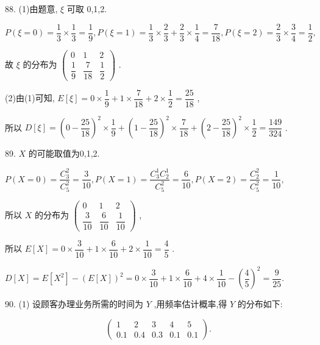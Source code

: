 88. (1)由题意, $\xi$ 可取 0,1,2.

$P\left( {\xi  = 0}\right)  = \dfrac{1}{3} \times  \dfrac{1}{3} = \dfrac{1}{9},P\left( {\xi  = 1}\right)  = \dfrac{1}{3} \times  \dfrac{2}{3} + \dfrac{2}{3} \times  \dfrac{1}{4} = \dfrac{7}{18},P\left( {\xi  = 2}\right)  = \dfrac{2}{3} \times  \dfrac{3}{4} = \dfrac{1}{2},$

故 $\xi$ 的分布为 $\left( \begin{matrix} 0 & 1 & 2 \\  \dfrac{1}{9} & \dfrac{7}{18} & \dfrac{1}{2} \end{matrix}\right)$ .

(2)由(1)可知, $E\left\lbrack  \xi \right\rbrack   = 0 \times  \dfrac{1}{9} + 1 \times  \dfrac{7}{18} + 2 \times  \dfrac{1}{2} = \dfrac{25}{18}$ ,

所以 $D\left\lbrack  \xi \right\rbrack   = {\left( 0 - \dfrac{25}{18}\right) }^{2} \times  \dfrac{1}{9} + {\left( 1 - \dfrac{25}{18}\right) }^{2} \times  \dfrac{7}{18} + {\left( 2 - \dfrac{25}{18}\right) }^{2} \times  \dfrac{1}{2} = \dfrac{149}{324}$ .

89. $X$ 的可能取值为0,1,2.

$P\left( {X = 0}\right)  = \dfrac{{C}_{3}^{2}}{{C}_{5}^{2}} = \dfrac{3}{10},P\left( {X = 1}\right)  = \dfrac{{C}_{3}^{1}{C}_{2}^{1}}{{C}_{5}^{2}} = \dfrac{6}{10},P\left( {X = 2}\right)  = \dfrac{{C}_{2}^{2}}{{C}_{5}^{2}} = \dfrac{1}{10},$

所以 $X$ 的分布为 $\left( \begin{matrix} 0 & 1 & 2 \\  \dfrac{3}{10} & \dfrac{6}{10} & \dfrac{1}{10} \end{matrix}\right)$ ,

所以 $E\left\lbrack  X\right\rbrack   = 0 \times  \dfrac{3}{10} + 1 \times  \dfrac{6}{10} + 2 \times  \dfrac{1}{10} = \dfrac{4}{5}$ .

$D\left\lbrack  X\right\rbrack   = E\left\lbrack  {X}^{2}\right\rbrack   - {\left( E\left\lbrack  X\right\rbrack  \right) }^{2} = 0 \times  \dfrac{3}{10} + 1 \times  \dfrac{6}{10} + 4 \times  \dfrac{1}{10} - {\left( \dfrac{4}{5}\right) }^{2} = \dfrac{9}{25}.$

90. (1) 设顾客办理业务所需的时间为 $Y$ ,用频率估计概率,得 $Y$ 的分布如下:

\[
\left( \begin{matrix} 1 & 2 & 3 & 4 & 5 \\  {0.1} & {0.4} & {0.3} & {0.1} & {0.1} \end{matrix}\right) .
\]

